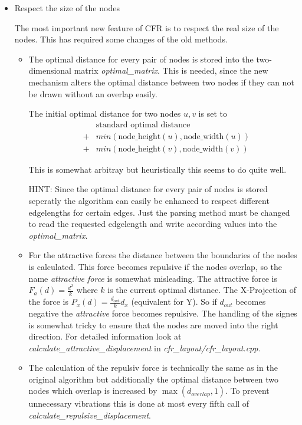 \documentclass[notitlepage,fleqn]{article}
\begin{document}
\begin{itemize}
\item Respect the size of the nodes

  The most important new feature of CFR is to respect the real size of
  the nodes. This has required some changes of the old methods.

\begin{itemize}
\item  The optimal distance for every pair of nodes is stored into the
  two-dimensional matrix {\em optimal\_matrix}. This is needed, since
  the new mechanism alters the optimal distance 
  between two nodes if they can not be drawn without an overlap easily.
  
  The initial optimal distance for two nodes $u,v$ is set to
  \begin{eqnarray*}
  & &\textrm{standard optimal distance} \\ 
  &+&min(\textrm{node\_height}(u),\textrm{node\_width}(u)) \\
  &+&min(\textrm{node\_height}(v),\textrm{node\_width}(v))
  \end{eqnarray*}

  This is somewhat arbitray but heuristically this seems to do quite well.

  HINT: Since the optimal
  distance for every pair of nodes is stored seperatly the algorithm
  can easily be enhanced to respect different edgelengths for certain
  edges. Just the parsing method must be changed to read the 
  requested edgelength and write according values into the
  {\em optimal\_matrix}.

\item For the attractive forces the distance between the boundaries
  of the nodes is calculated. This force becomes repulsive if the
  nodes overlap, so the name {\em attractive force} is somewhat misleading.
  The attractive force is $F_a(d)=\frac{d^2}{k}$ where $k$ is the
  current optimal distance. The X-Projection of the force is
  $P_x(d) = \frac{d_{out}}{k} d_x$ (equivalent for Y). So if $d_{out}$
  becomes negative the {\em attractive} force becomes repulsive.
  The handling of the signes is somewhat tricky 
  to ensure that the nodes are
  moved into the right direction.
  For detailed information look at 
  {\em calculate\_attractive\_displacement}
  in {\em cfr\_layout/cfr\_layout.cpp}.

\item  The calculation of the repulsiv force is technically the same
  as in the original algorithm but additionally the optimal distance
  between two nodes which overlap is increased by
  $\max(d_{overlap},1)$. To prevent unnecessary vibrations
  this is done at most every fifth call
  of {\em calculate\_repulsive\_displacement}. 


\end{itemize}
\end{itemize}
\end{document}
